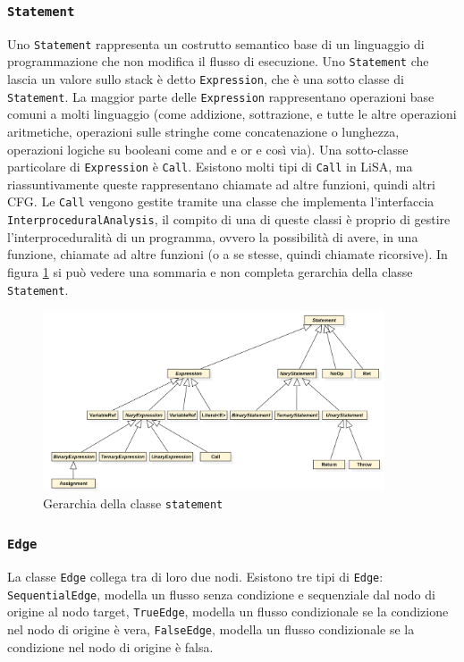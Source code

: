 \subsubsection{\texttt{Statement}}
Uno \texttt{Statement} rappresenta un costrutto semantico base di un linguaggio di programmazione che non modifica il flusso di esecuzione. Uno \texttt{Statement} che lascia un valore sullo stack è detto \texttt{Expression}, che è una sotto classe di \texttt{Statement}. La maggior parte delle \texttt{Expression} rappresentano operazioni base comuni a molti linguaggio (come addizione, sottrazione, e tutte le altre operazioni aritmetiche, operazioni sulle stringhe come concatenazione o lunghezza, operazioni logiche su booleani come and e or e così via). Una sotto-classe particolare di \texttt{Expression} è \texttt{Call}. Esistono molti tipi di \texttt{Call} in LiSA, ma riassuntivamente queste rappresentano chiamate ad altre funzioni, quindi altri CFG. Le \texttt{Call} vengono gestite tramite una classe che implementa l'interfaccia \texttt{InterproceduralAnalysis}, il compito di una di queste classi è proprio di gestire l'interproceduralità di un programma, ovvero la possibilità di avere, in una funzione, chiamate ad altre funzioni (o a se stesse, quindi chiamate ricorsive). In figura \ref{fig:gerarchiaStatement} si può vedere una sommaria e non completa gerarchia della classe \texttt{Statement}.

\begin{figure}[ht]
	\centering
	\includegraphics[width=0.9\textwidth]{Immagini/gerarchiaStatement.png}
	\caption{Gerarchia della classe \texttt{statement}}
	\label{fig:gerarchiaStatement}
\end{figure}

\subsubsection{\texttt{Edge}}
La classe \texttt{Edge} collega tra di loro due nodi. Esistono tre tipi di \texttt{Edge}: \texttt{SequentialEdge}, modella un flusso senza condizione e sequenziale dal nodo di origine al nodo target, \texttt{TrueEdge}, modella un flusso condizionale se la condizione nel nodo di origine è vera, \texttt{FalseEdge}, modella un flusso condizionale se la condizione nel nodo di origine è falsa.
\\

